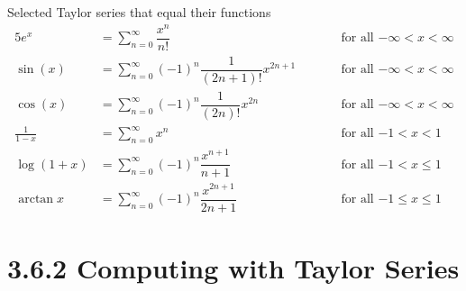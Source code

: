 \begin{frame}[t]

\begin{block}{Selected Taylor series that equal their functions}
\begin{alignat*}{5}
e^x &= \textstyle\sum\limits_{n=0}^\infty\dfrac{x^n}{n!}
    &&\qquad\text{for all $-\infty<x<\infty$} \\[1mm]
\sin(x) &= \textstyle\sum\limits_{n=0}^\infty(-1)^n\dfrac{1}{(2n+1)!}x^{2n+1}
    &&\qquad\text{for all $-\infty<x<\infty$} \\[1mm]
\cos(x) &= \textstyle\sum\limits_{n=0}^\infty(-1)^n\dfrac{1}{(2n)!}x^{2n}
    &&\qquad\text{for all $-\infty<x<\infty$} \\[1mm]
\frac{1}{1-x} &= \textstyle\sum\limits_{n=0}^\infty x^n
    &&\qquad\text{for all $-1<x<1$} \\[1mm]
\log(1+x) &= \textstyle\sum\limits_{n=0}^\infty (-1)^n\dfrac{x^{n+1}}{n+1}
    &&\qquad\text{for all $-1<x\le 1$} \\[1mm]
\arctan x &=  \textstyle\sum\limits_{n=0}^\infty (-1)^n\dfrac{x^{2n+1}}{2n+1}
    &&\qquad\text{for all $-1\le x\le 1$}
\end{alignat*}
\end{block}
\end{frame}
\section{3.6.2 Computing with Taylor Series}

